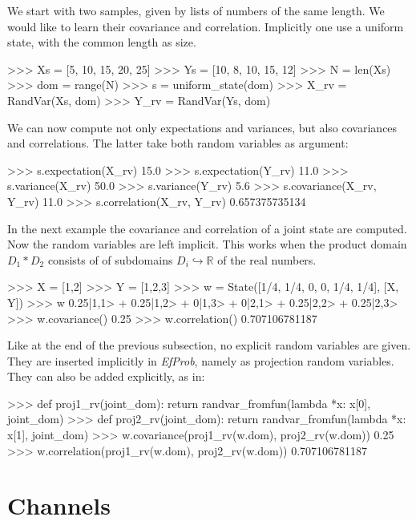 \documentclass[leqno]{tufte-book} %
\newcommand{\EfProb}{\textit{EfProb}\xspace}
\newcommand{\RN}{\mathbb{R}}     %
\begin{document}
%

We start with two samples, given by lists of numbers of the same
length. We would like to learn their covariance and correlation.
Implicitly one use a uniform state, with the common length as size.
\begin{python}
>>> Xs = [5, 10, 15, 20, 25]
>>> Ys = [10,  8, 10, 15, 12]
>>> N = len(Xs)
>>> dom = range(N)
>>> s = uniform_state(dom)
>>> X_rv = RandVar(Xs, dom)
>>> Y_rv = RandVar(Ys, dom)
\end{python}

\noindent We can now compute not only expectations and variances, but
also covariances and correlations. The latter take both random
variables as argument:
\begin{python}
>>> s.expectation(X_rv)
15.0
>>> s.expectation(Y_rv)
11.0
>>> s.variance(X_rv)
50.0
>>> s.variance(Y_rv)
5.6
>>> s.covariance(X_rv, Y_rv)
11.0
>>> s.correlation(X_rv, Y_rv)
0.657375735134
\end{python}


In the next example the covariance and correlation of a joint state
are computed. Now the random variables are left implicit.  This works
when the product domain $D_{1} * D_{2}$ consists of of subdomains
$D_{i} \hookrightarrow \RN$ of the real numbers.
\begin{python}
>>> X = [1,2]
>>> Y = [1,2,3]
>>> w = State([1/4, 1/4, 0, 0, 1/4, 1/4], [X, Y])
>>> w
0.25|1,1> + 0.25|1,2> + 0|1,3> + 0|2,1> + 0.25|2,2> + 0.25|2,3>
>>> w.covariance()
0.25
>>> w.correlation()
0.707106781187
\end{python}

\noindent Like at the end of the previous subsection, no explicit
random variables are given. They are inserted implicitly in \EfProb,
namely as projection random variables. They can also be added 
explicitly, as in:
\begin{python}
>>> def proj1_rv(joint_dom): return randvar_fromfun(lambda *x: x[0], joint_dom)
>>> def proj2_rv(joint_dom): return randvar_fromfun(lambda *x: x[1], joint_dom)
>>> w.covariance(proj1_rv(w.dom), proj2_rv(w.dom))
0.25
>>> w.correlation(proj1_rv(w.dom), proj2_rv(w.dom))
0.707106781187
\end{python}



\section{Channels}\label{sec:dchannel}
\end{document}
